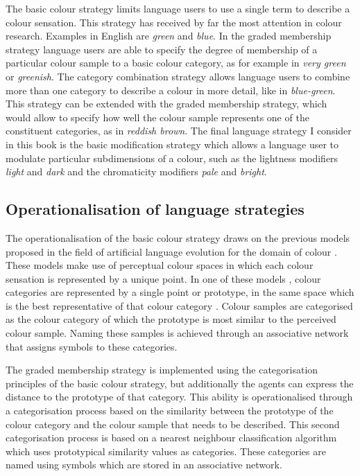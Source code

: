 The basic colour strategy limits language users to use a single
term to describe a colour sensation. This strategy has received by far
the most attention in colour research. Examples in English are
\textit{green} and \textit{blue}. In the graded membership strategy
language users are able to specify the degree of membership of a
particular colour sample to a basic colour category, as for example in
\textit{very green} or \textit{greenish}. The category combination
  strategy allows language users to combine more than one category to
describe a colour in more detail, like in \textit{blue-green}. This
strategy can be extended with the graded membership strategy,
which would allow to specify how well the colour sample represents one
of the constituent categories, as in \textit{reddish brown}. The final
language strategy I consider in this book is the basic
  modification strategy which allows a language user to modulate
particular subdimensions of a colour, such as the lightness modifiers
\textit{light} and \textit{dark} and the chromaticity modifiers \textit{pale} and
\textit{bright}.

\subsection{Operationalisation of language strategies}

The operationalisation of the basic colour strategy draws on
the previous models proposed in the field of artificial language
evolution for the domain of colour \citep{steels05coordinating}. These
models make use of perceptual colour spaces in which each colour
sensation is represented by a unique point. In one of these models
\citep{belpaeme05explaining}, colour categories are represented by a
single point or prototype, in the same space which is the best
representative of that colour category \citep{rosch73natural}. Colour
samples are categorised as the colour category of which the prototype
is most similar to the perceived colour sample. Naming these samples
is achieved through an associative network that assigns symbols to
these categories.

The graded membership strategy is implemented using the
categorisation principles of the basic colour strategy, but
additionally the agents can express the distance to the prototype of
that category. This ability is operationalised through a
categorisation process based on the similarity between the prototype
of the colour category and the colour sample that needs to be
described. This second categorisation process is based on a nearest
neighbour classification algorithm which uses prototypical similarity
values as categories. These categories are named using symbols which
are stored in an associative network.

